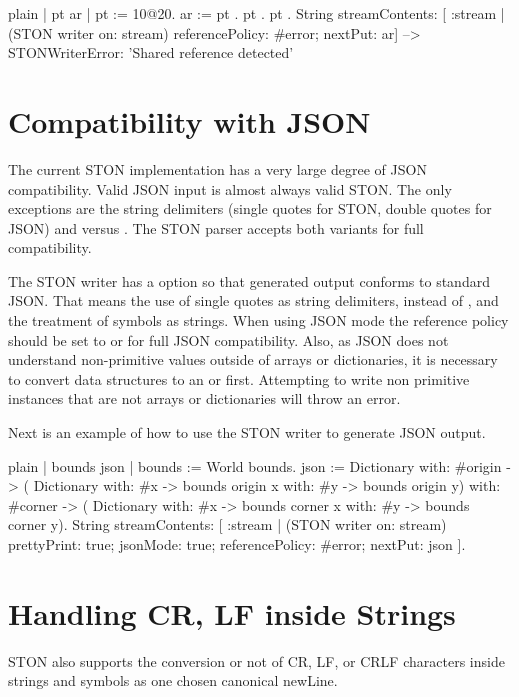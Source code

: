 \documentclass[10pt,twoside,english]{_support/latex/sbabook/sbabook}
\begin{document}
\begin{displaycode}{plain}
| pt ar |
pt := 10@20.
ar := { pt . pt . pt }.
String streamContents: [ :stream |
   (STON writer on: stream)
      referencePolicy: #error;
      nextPut: ar]
   --> STONWriterError: 'Shared reference detected'
\end{displaycode}
\section{Compatibility with JSON}
The current STON implementation has a very large degree of JSON compatibility.
Valid JSON input is almost always valid STON. The only exceptions are the string delimiters (single quotes for STON, double quotes for JSON) and  versus
. The STON parser accepts both variants for full compatibility.

The STON writer has a  option so that generated output conforms to standard JSON. That means the use of single quotes as string delimiters, 
instead of , and the treatment of symbols as strings. When using JSON mode the reference policy should be set to  or  for full JSON
compatibility. Also, as JSON does not understand non-primitive values outside of arrays or dictionaries, it is necessary to convert data structures to an
 or  first. Attempting to write non primitive instances that are not arrays or dictionaries will throw an error.

Next is an example of how to use the STON writer to generate JSON output.

\begin{displaycode}{plain}
| bounds json |
bounds := World bounds.
json := Dictionary
   with: #origin -> (
      Dictionary
         with: #x -> bounds origin x
         with: #y -> bounds origin y)
   with: #corner -> (
      Dictionary
         with: #x -> bounds corner x
         with: #y -> bounds corner y).
String streamContents: [ :stream |
   (STON writer on: stream)
      prettyPrint: true;
      jsonMode: true;
      referencePolicy: #error;
      nextPut: json ].
\end{displaycode}
\section{Handling CR, LF inside Strings}
STON also supports the conversion or not of CR, LF, or CRLF characters inside strings and symbols as one chosen canonical newLine.
\end{document}
